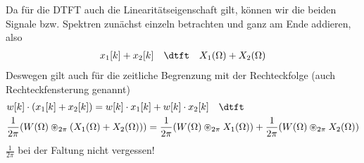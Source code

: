 \begin{Ansatz}
\begin{center}
\begin{tikzpicture}[scale=0.75]
\end{tikzpicture}
\end{center}
Da für die DTFT auch die Linearitätseigenschaft gilt, können wir die beiden Signale
bzw. Spektren zunächst einzeln betrachten und ganz am Ende addieren, also
\begin{align}
x_1[k] + x_2[k] \quad\dtft\quad X_1(\Omega)+X_2(\Omega)
\end{align}
Deswegen gilt auch für die zeitliche Begrenzung mit der Rechteckfolge (auch Rechteckfensterung genannt)
\begin{align}
&w[k] \cdot (x_1[k] + x_2[k]) = w[k] \cdot x_1[k] + w[k] \cdot x_2[k]
\quad\dtft\quad\\
&\frac{1}{2\pi} (W(\Omega) \circledast_{2\pi} ( X_1(\Omega)+X_2(\Omega))) = \frac{1}{2\pi} (W(\Omega) \circledast_{2\pi} X_1(\Omega)) + \frac{1}{2\pi} (W(\Omega) \circledast_{2\pi} X_2(\Omega))
\end{align}
$\frac{1}{2\pi}$ bei der Faltung nicht vergessen!

\end{Ansatz}

